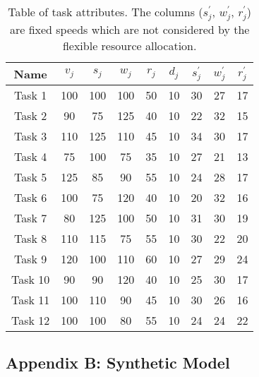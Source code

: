 \begin{table}[h]
    \begin{tabular}{|c|c|c|c|c|c|c|c|c|}
        \hline
        Name    & $v_j$ & $s_j$ & $w_j$ & $r_j$ & $d_j$ & $s^{'}_j$ & $w^{'}_j$ & $r^{'}_j$ \\ [0.5ex] \hline
        Task 1  & 100   & 100   & 100   & 50    & 10    & 30        & 27        & 17        \\ \hline
        Task 2  & 90    & 75    & 125   & 40    & 10    & 22        & 32        & 15        \\ \hline
        Task 3  & 110   & 125   & 110   & 45    & 10    & 34        & 30        & 17        \\ \hline
        Task 4  & 75    & 100   & 75    & 35    & 10    & 27        & 21        & 13        \\ \hline
        Task 5  & 125   & 85    & 90    & 55    & 10    & 24        & 28        & 17        \\ \hline
        Task 6  & 100   & 75    & 120   & 40    & 10    & 20        & 32        & 16        \\ \hline
        Task 7  & 80    & 125   & 100   & 50    & 10    & 31        & 30        & 19        \\ \hline
        Task 8  & 110   & 115   & 75    & 55    & 10    & 30        & 22        & 20        \\ \hline
        Task 9  & 120   & 100   & 110   & 60    & 10    & 27        & 29        & 24        \\ \hline
        Task 10 & 90    & 90    & 120   & 40    & 10    & 25        & 30        & 17        \\ \hline
        Task 11 & 100   & 110   & 90    & 45    & 10    & 30        & 26        & 16        \\ \hline
        Task 12 & 100   & 100   & 80    & 55    & 10    & 24        & 24        & 22        \\ \hline
    \end{tabular}
    \caption{Table of task attributes. The columns ($s^{'}_j$, $w^{'}_j$, $r^{'}_j$) are fixed speeds which are not
    considered by the flexible resource allocation.}
    \label{tab:example-tasks-properties}
\end{table}

\subsection*{Appendix B: Synthetic Model}
\label{subsec:appendix_b}
